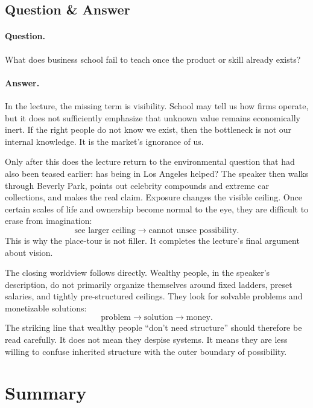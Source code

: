 \subsection{Question \& Answer}

\paragraph{Question.} What does business school fail to teach once the product or skill already exists?

\paragraph{Answer.} In the lecture, the missing term is visibility. School may tell us how firms operate, but it does not sufficiently emphasize that unknown value remains economically inert. If the right people do not know we exist, then the bottleneck is not our internal knowledge. It is the market's ignorance of us.

Only after this does the lecture return to the environmental question that had also been teased earlier: has being in Los Angeles helped? The speaker then walks through Beverly Park, points out celebrity compounds and extreme car collections, and makes the real claim. Exposure changes the visible ceiling. Once certain scales of life and ownership become normal to the eye, they are difficult to erase from imagination:
\begin{equation}
\text{see larger ceiling} \to \text{cannot unsee possibility}.
\end{equation}
This is why the place-tour is not filler. It completes the lecture's final argument about vision.

The closing worldview follows directly. Wealthy people, in the speaker's description, do not primarily organize themselves around fixed ladders, preset salaries, and tightly pre-structured ceilings. They look for solvable problems and monetizable solutions:
\begin{equation}
\text{problem} \to \text{solution} \to \text{money}.
\end{equation}
The striking line that wealthy people ``don't need structure'' should therefore be read carefully. It does not mean they despise systems. It means they are less willing to confuse inherited structure with the outer boundary of possibility.

\section{Summary}

